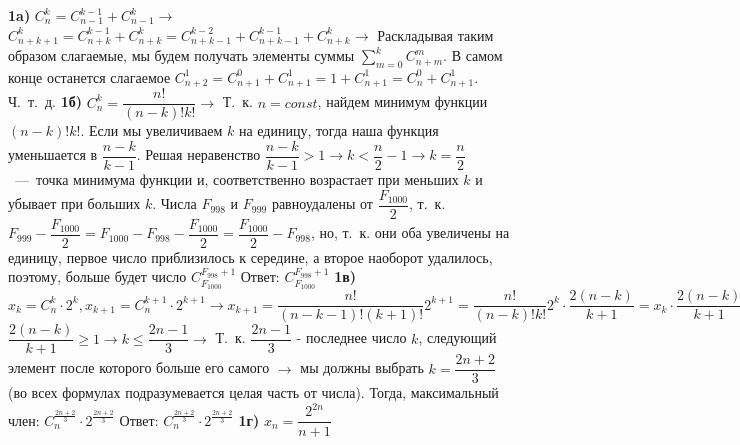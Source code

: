 \documentclass[12pt,a4paper,fleqn]{article}
\begin{document}
{\bf 1a)} $C_n^k = C_{n - 1}^{k - 1} + C_{n - 1}^k \rightarrow$ \newline
$C_{n + k + 1}^k = C_{n + k}^{k - 1} + C_{n + k}^k = C_{n + k - 1}^{k - 2} + C_{n + k - 1}^{k - 1} + C_{n + k}^k \rightarrow$ Раскладывая таким образом слагаемые, мы будем получать элементы суммы $\sum_{m = 0}^k C_{n + m}^m$. В самом конце останется слагаемое $C_{n + 2}^1 = C_{n + 1}^0 + C_{n + 1}^1 = 1 + C_{n + 1}^1 = C_n^0 + C_{n + 1}^1$. Ч.~т.~д. \newline \newline
{\bf 1б)} $C_n^k = \dfrac{n!}{(n - k)!k!} \rightarrow$ Т.~к. $n = const$, найдем минимум функции $(n -k)!k!$. Если мы увеличиваем $k$ на единицу, тогда наша функция уменьшается в $\dfrac{n - k}{k - 1}$. Решая неравенство $\dfrac{n - k}{k - 1} > 1 \rightarrow k < \dfrac{n}{2} - 1 \rightarrow k = \dfrac{n}{2}$~---~точка минимума функции и, соответственно возрастает при меньших $k$ и убывает при больших $k$.\newline
Числа $F_{998}$ и $F_{999}$ равноудалены от $\dfrac{F_{1000}}{2}$, т.~к. $F_{999} - \dfrac{F_{1000}}{2} = F_{1000} - F_{998} - \dfrac{F_{1000}}{2} = \dfrac{F_{1000}}{2} - F_{998}$, но, т.~к. они оба увеличены на единицу, первое число приблизилось к середине, а второе наоборот удалилось, поэтому, больше будет число $C_{F_{1000}}^{F_{998} + 1}$ \newline
Ответ: $C_{F_{1000}}^{F_{998} + 1}$ \newline \newline
{\bf 1в)} $x_k = C_n^k \cdot 2^k, x_{k + 1} = C_n^{k + 1} \cdot 2^{k + 1} \rightarrow x_{k + 1} = \dfrac{n!}{(n - k - 1)!(k + 1)!}2^{k + 1} = \dfrac{n!}{(n - k)!k!}2^k \cdot \dfrac{2(n - k)}{k + 1} = x_k \cdot \dfrac{2(n - k)}{k + 1} \rightarrow$ \newline
$\dfrac{2(n - k)}{k + 1} \geqslant 1 \rightarrow k \leqslant \dfrac{2n - 1}{3} \rightarrow$ Т.~к. $\dfrac{2n - 1}{3}$ - последнее число $k$, следующий элемент после которого больше его самого $\rightarrow$ мы должны выбрать $k = \dfrac{2n + 2}{3}$ (во всех формулах подразумевается целая часть от числа).\newline
Тогда, максимальный член: $C_n^{\frac{2n + 2}{3}} \cdot 2^{\frac{2n + 2}{3}}$ \newline
Ответ: $C_n^{\frac{2n + 2}{3}} \cdot 2^{\frac{2n + 2}{3}}$ \newline \newline
{\bf 1г)} $x_n = \dfrac{2^{2n}}{n + 1}$ 
\end{document}
